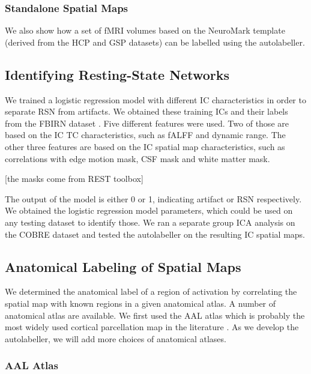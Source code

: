 \documentclass{article}
\begin{document}
\subsubsection{Standalone Spatial Maps}

We also show how a set of \ac{fMRI} volumes based on the NeuroMark template (derived from the \ac{HCP} and \ac{GSP} datasets) can be labelled using the autolabeller.

\subsection{Identifying Resting-State Networks}

We trained a logistic regression model with different \ac{IC} characteristics in order to separate \ac{RSN} from artifacts.
We obtained these training \acp{IC} and their labels from the \ac{FBIRN} dataset \citep{b1}.
Five different features were used.
Two of those are based on the \ac{IC} \ac{TC} characteristics, such as \ac{fALFF} and dynamic range.
The other three features are based on the \ac{IC} spatial map characteristics, such as correlations with edge motion mask, \ac{CSF} mask and white matter mask.

[the masks come from REST toolbox]

The output of the model is either 0 or 1, indicating artifact or \ac{RSN} respectively.
We obtained the logistic regression model parameters, which could be used on any testing dataset to identify those.
We ran a separate group \ac{ICA} analysis on the \ac{COBRE} dataset and tested the autolabeller on the resulting \ac{IC} spatial maps.

\subsection{Anatomical Labeling of Spatial Maps}

We determined the anatomical label of a region of activation by correlating the spatial map with known regions in a given anatomical atlas.
A number of anatomical atlas are available.
We first used the \ac{AAL} atlas which is probably the most widely used cortical parcellation map in the literature \citep{b2}.
As we develop the autolabeller, we will add more choices of anatomical atlases.

\subsubsection{AAL Atlas}
\end{document}
